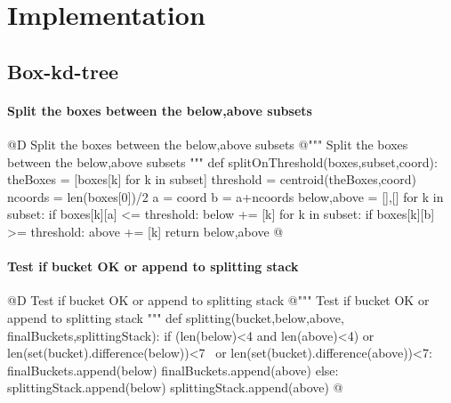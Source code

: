 \documentclass[11pt,oneside]{article}    %
\begin{document}
\section{Implementation}

\subsection{Box-kd-tree}


\paragraph{Split the boxes between the below,above subsets}
@D Split the boxes between the below,above subsets
@{""" Split the boxes between the below,above subsets """
def splitOnThreshold(boxes,subset,coord):
    theBoxes = [boxes[k] for k in subset]
    threshold = centroid(theBoxes,coord)
    ncoords = len(boxes[0])/2
    a = coord%
    b = a+ncoords
    below,above = [],[]
    for k in subset:
        if boxes[k][a] <= threshold: below += [k]
    for k in subset:
        if boxes[k][b] >= threshold: above += [k]
    return below,above
@}

\paragraph{Test if bucket OK or append to splitting stack}
@D Test if bucket OK or append to splitting stack
@{""" Test if bucket OK or append to splitting stack """
def splitting(bucket,below,above, finalBuckets,splittingStack):
    if (len(below)<4 and len(above)<4) or len(set(bucket).difference(below))<7 \
        or len(set(bucket).difference(above))<7: 
        finalBuckets.append(below)
        finalBuckets.append(above)
    else: 
        splittingStack.append(below)
        splittingStack.append(above)
@}
\end{document}

